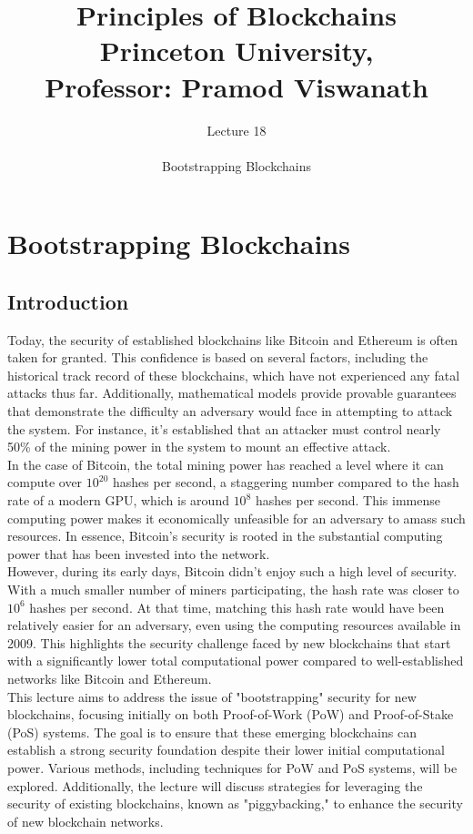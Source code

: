 \documentclass{report}
\title{\Huge{Principles of Blockchains \\ Princeton University,\\
		Professor: Pramod Viswanath}}
\author{\huge{Lecture 18} \\\\ Bootstrapping Blockchains}
\begin{document}
\maketitle
\newpage%
\tableofcontents
\pagebreak
  
\chapter{Bootstrapping Blockchains}
\section{Introduction}
Today, the security of established blockchains like Bitcoin and Ethereum is often taken for granted. This confidence is based on several factors, including the historical track record of these blockchains, which have not experienced any fatal attacks thus far. Additionally, mathematical models provide provable guarantees that demonstrate the difficulty an adversary would face in attempting to attack the system. For instance, it's established that an attacker must control nearly 50\% of the mining power in the system to mount an effective attack. \\
In the case of Bitcoin, the total mining power has reached a level where it can compute over $10^{20}$ hashes per second, a staggering number compared to the hash rate of a modern GPU, which is around $10^{8}$ hashes per second. This immense computing power makes it economically unfeasible for an adversary to amass such resources. In essence, Bitcoin's security is rooted in the substantial computing power that has been invested into the network.\\
However, during its early days, Bitcoin didn't enjoy such a high level of security. With a much smaller number of miners participating, the hash rate was closer to $10^{6}$ hashes per second. At that time, matching this hash rate would have been relatively easier for an adversary, even using the computing resources available in 2009. This highlights the security challenge faced by new blockchains that start with a significantly lower total computational power compared to well-established networks like Bitcoin and Ethereum.\\
This lecture aims to address the issue of "bootstrapping" security for new blockchains, focusing initially on both Proof-of-Work (PoW) and Proof-of-Stake (PoS) systems. The goal is to ensure that these emerging blockchains can establish a strong security foundation despite their lower initial computational power. Various methods, including techniques for PoW and PoS systems, will be explored. Additionally, the lecture will discuss strategies for leveraging the security of existing blockchains, known as "piggybacking," to enhance the security of new blockchain networks.
\end{document}
